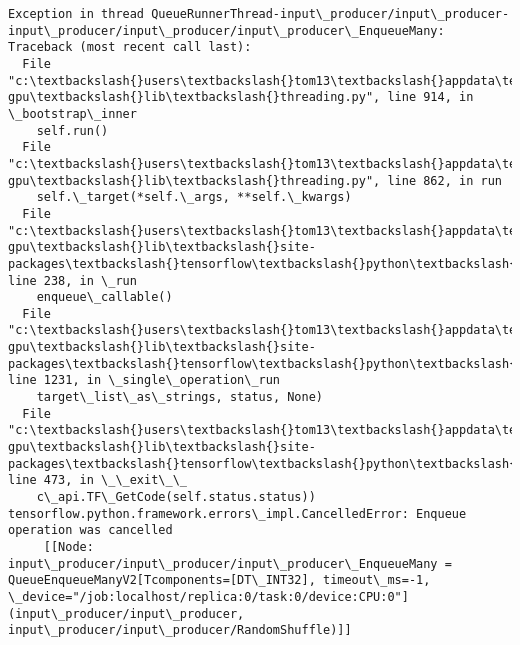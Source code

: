 \documentclass[11pt]{article}
\begin{document}
\begin{Verbatim}[commandchars=\\\{\}]
Exception in thread QueueRunnerThread-input\_producer/input\_producer-input\_producer/input\_producer/input\_producer\_EnqueueMany:
Traceback (most recent call last):
  File "c:\textbackslash{}users\textbackslash{}tom13\textbackslash{}appdata\textbackslash{}local\textbackslash{}conda\textbackslash{}conda\textbackslash{}envs\textbackslash{}tensorflow-gpu\textbackslash{}lib\textbackslash{}threading.py", line 914, in \_bootstrap\_inner
    self.run()
  File "c:\textbackslash{}users\textbackslash{}tom13\textbackslash{}appdata\textbackslash{}local\textbackslash{}conda\textbackslash{}conda\textbackslash{}envs\textbackslash{}tensorflow-gpu\textbackslash{}lib\textbackslash{}threading.py", line 862, in run
    self.\_target(*self.\_args, **self.\_kwargs)
  File "c:\textbackslash{}users\textbackslash{}tom13\textbackslash{}appdata\textbackslash{}local\textbackslash{}conda\textbackslash{}conda\textbackslash{}envs\textbackslash{}tensorflow-gpu\textbackslash{}lib\textbackslash{}site-packages\textbackslash{}tensorflow\textbackslash{}python\textbackslash{}training\textbackslash{}queue\_runner\_impl.py", line 238, in \_run
    enqueue\_callable()
  File "c:\textbackslash{}users\textbackslash{}tom13\textbackslash{}appdata\textbackslash{}local\textbackslash{}conda\textbackslash{}conda\textbackslash{}envs\textbackslash{}tensorflow-gpu\textbackslash{}lib\textbackslash{}site-packages\textbackslash{}tensorflow\textbackslash{}python\textbackslash{}client\textbackslash{}session.py", line 1231, in \_single\_operation\_run
    target\_list\_as\_strings, status, None)
  File "c:\textbackslash{}users\textbackslash{}tom13\textbackslash{}appdata\textbackslash{}local\textbackslash{}conda\textbackslash{}conda\textbackslash{}envs\textbackslash{}tensorflow-gpu\textbackslash{}lib\textbackslash{}site-packages\textbackslash{}tensorflow\textbackslash{}python\textbackslash{}framework\textbackslash{}errors\_impl.py", line 473, in \_\_exit\_\_
    c\_api.TF\_GetCode(self.status.status))
tensorflow.python.framework.errors\_impl.CancelledError: Enqueue operation was cancelled
	 [[Node: input\_producer/input\_producer/input\_producer\_EnqueueMany = QueueEnqueueManyV2[Tcomponents=[DT\_INT32], timeout\_ms=-1, \_device="/job:localhost/replica:0/task:0/device:CPU:0"](input\_producer/input\_producer, input\_producer/input\_producer/RandomShuffle)]]


\end{Verbatim}
\end{document}
